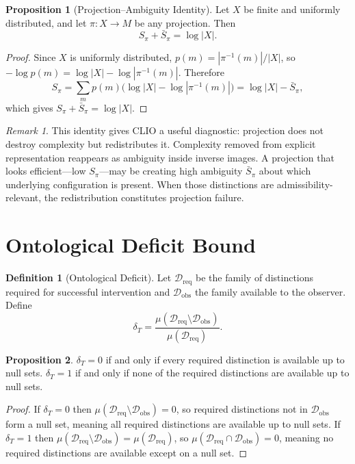 \documentclass[11pt, oneside]{book}
\theoremstyle{definition}
\newtheorem{definition}{Definition}[chapter]
\newtheorem{proposition}{Proposition}[chapter]
\theoremstyle{remark}
\newtheorem{remark}{Remark}[chapter]
\begin{document}
\begin{proposition}[Projection--Ambiguity Identity]
Let $X$ be finite and uniformly distributed, and let $\pi:X\to M$ be any projection. Then
\[
S_\pi + \bar{S}_{\pi} = \log|X|.
\]
\end{proposition}

\begin{proof}
Since $X$ is uniformly distributed, $p(m) = |\pi^{-1}(m)|/|X|$, so $-\log p(m) = \log|X| - \log|\pi^{-1}(m)|$. Therefore
\[
S_\pi = \sum_{m}p(m)\bigl(\log|X| - \log|\pi^{-1}(m)|\bigr) = \log|X| - \bar{S}_\pi,
\]
which gives $S_\pi + \bar{S}_\pi = \log|X|$.
\end{proof}

\begin{remark}
This identity gives CLIO a useful diagnostic: projection does not destroy complexity but redistributes it. Complexity removed from explicit representation reappears as ambiguity inside inverse images. A projection that looks efficient---low $S_\pi$---may be creating high ambiguity $\bar{S}_\pi$ about which underlying configuration is present. When those distinctions are admissibility-relevant, the redistribution constitutes projection failure.
\end{remark}

\section{Ontological Deficit Bound}

\begin{definition}[Ontological Deficit]
Let $\mathcal{D}_{\mathrm{req}}$ be the family of distinctions required for successful intervention and $\mathcal{D}_{\mathrm{obs}}$ the family available to the observer. Define
\[
\delta_T = \frac{\mu(\mathcal{D}_{\mathrm{req}}\setminus \mathcal{D}_{\mathrm{obs}})}{\mu(\mathcal{D}_{\mathrm{req}})}.
\]
\end{definition}

\begin{proposition}
$\delta_T = 0$ if and only if every required distinction is available up to null sets. $\delta_T = 1$ if and only if none of the required distinctions are available up to null sets.
\end{proposition}

\begin{proof}
If $\delta_T = 0$ then $\mu(\mathcal{D}_{\mathrm{req}}\setminus\mathcal{D}_{\mathrm{obs}}) = 0$, so required distinctions not in $\mathcal{D}_{\mathrm{obs}}$ form a null set, meaning all required distinctions are available up to null sets. If $\delta_T = 1$ then $\mu(\mathcal{D}_{\mathrm{req}}\setminus\mathcal{D}_{\mathrm{obs}}) = \mu(\mathcal{D}_{\mathrm{req}})$, so $\mu(\mathcal{D}_{\mathrm{req}}\cap\mathcal{D}_{\mathrm{obs}}) = 0$, meaning no required distinctions are available except on a null set.
\end{proof}
\end{document}

